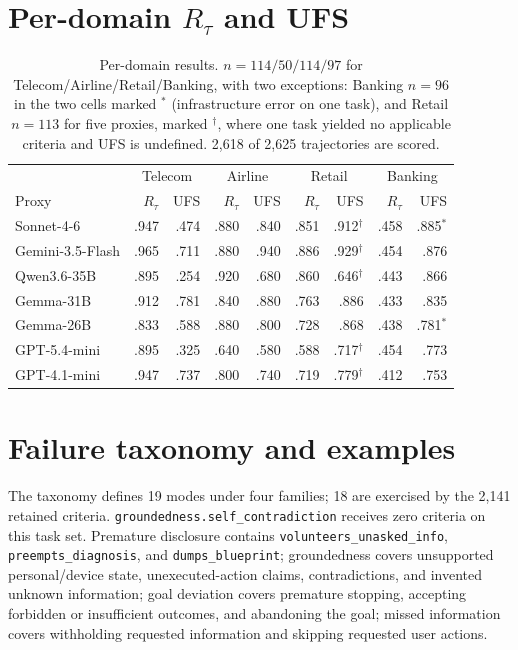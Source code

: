 \documentclass{article}
\begin{document}
\section{Per-domain $R_{\tau}$ and UFS}
\begin{table}[H]
\centering
\scriptsize
\setlength{\tabcolsep}{2.4pt}
\begin{tabular}{lrrrrrrrr}
\toprule
& \multicolumn{2}{c}{Telecom} & \multicolumn{2}{c}{Airline} & \multicolumn{2}{c}{Retail} & \multicolumn{2}{c}{Banking} \\
Proxy & $R_{\tau}$ & UFS & $R_{\tau}$ & UFS & $R_{\tau}$ & UFS & $R_{\tau}$ & UFS \\
\midrule
Sonnet-4-6 & .947 & .474 & .880 & .840 & .851 & .912$^{\dagger}$ & .458 & .885$^{*}$ \\
Gemini-3.5-Flash & .965 & .711 & .880 & .940 & .886 & .929$^{\dagger}$ & .454 & .876 \\
Qwen3.6-35B & .895 & .254 & .920 & .680 & .860 & .646$^{\dagger}$ & .443 & .866 \\
Gemma-31B & .912 & .781 & .840 & .880 & .763 & .886 & .433 & .835 \\
Gemma-26B & .833 & .588 & .880 & .800 & .728 & .868 & .438 & .781$^{*}$ \\
GPT-5.4-mini & .895 & .325 & .640 & .580 & .588 & .717$^{\dagger}$ & .454 & .773 \\
GPT-4.1-mini & .947 & .737 & .800 & .740 & .719 & .779$^{\dagger}$ & .412 & .753 \\
\bottomrule
\end{tabular}
\caption{Per-domain results. $n=114/50/114/97$ for Telecom/Airline/Retail/Banking, with two exceptions: Banking $n=96$ in the two cells marked $^{*}$ (infrastructure error on one task), and Retail $n=113$ for five proxies, marked $^{\dagger}$, where one task yielded no applicable criteria and UFS is undefined. 2,618 of 2,625 trajectories are scored.}
\label{tab:perdomain}
\end{table}

\section{Failure taxonomy and examples}
The taxonomy defines 19 modes under four families; 18 are exercised by the 2,141 retained criteria. \texttt{groundedness.self\_contradiction} receives zero criteria on this task set. Premature disclosure contains \texttt{volunteers\_unasked\_info}, \texttt{preempts\_diagnosis}, and \texttt{dumps\_blueprint}; groundedness covers unsupported personal/device state, unexecuted-action claims, contradictions, and invented unknown information; goal deviation covers premature stopping, accepting forbidden or insufficient outcomes, and abandoning the goal; missed information covers withholding requested information and skipping requested user actions.
\end{document}
